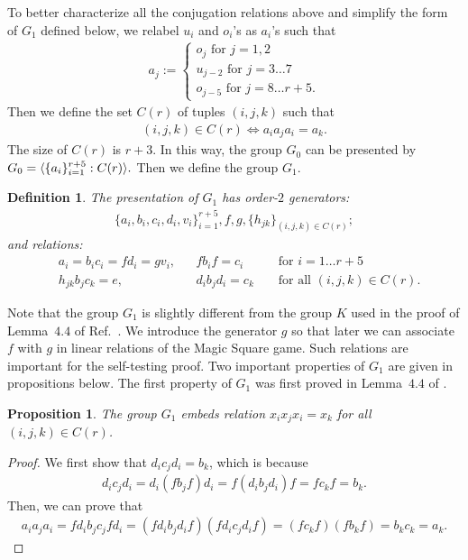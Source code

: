 \documentclass[11pt,letterpaper]{article}
\DeclarePairedDelimiter{\ip}{\langle}{\rangle}
\newcommand{\1}{\mathbb{1}}
\newtheorem{proposition}[theorem]{Proposition}
\newtheorem{definition}[theorem]{Definition}
\theoremstyle{definition}
\begin{document}
To better characterize all the conjugation relations above and simplify the form of $G_1$ defined below, 
we relabel $u_i$ and $o_i$'s
as $a_i$'s such that
\begin{align}
	a_j := 
	\begin{cases}
	 o_j \text{ for } j = 1,2 \\
	 u_{j-2} \text{ for } j = 3\dots 7 \\
	o_{j- 5} \text{ for } j = 8 \dots r+5.
	\end{cases}
\end{align}
Then we define the set $C(r)$ of tuples $(i,j,k)$ such that
\begin{align*}
	(i,j,k) \in C(r) \iff a_ia_ja_i = a_k.
\end{align*}
The size of $C(r)$ is $r+3$. 
In this way, the group $G_0$ can be presented by
$
G_0  = \ip{ \{a_i\}_{i=1}^{r+5} : C(r) }.
$
Then we define the group $G_1$.
\begin{definition}
The presentation of $G_1$ has order-$2$ generators:
\begin{align*}
	\{a_i, b_i, c_i, d_i, v_i\}_{i=1}^{r+5}, f, g, \{h_{jk}\}_{(i,j,k) \in C(r)};
\end{align*}
and relations:
\begin{align*}
	&a_i = b_ic_i = fd_i = gv_i,&& fb_if =c_i &&\text{ for } i= 1 \dots r+5 \\
	&h_{jk}b_j c_k = e,&& d_ib_jd_i = c_k &&\text{ for all } (i,j,k) \in C(r).
\end{align*}
\end{definition}
Note that the group $G_1$ is slightly different from the group $K$ used in the proof of Lemma~$4.4$ of Ref.~\cite{slofstra2017}.
We introduce the generator $g$ so that later we can associate $f$ with $g$ in linear relations of the Magic Square game.
Such relations are important for the self-testing proof.
Two important properties of $G_1$ are given in propositions below.
The first property of $G_1$ was first proved in Lemma~$4.4$ of \cite{slofstra2017}.
\begin{proposition}
	The group $G_1$ embeds relation $x_ix_jx_i = x_k$ for all $(i,j,k) \in C(r)$.
\end{proposition}
\begin{proof}
	We first show that $d_i c_j d_i = b_k$, which is because
	\begin{align*}
		d_i c_j d_i = d_i (f b_j f) d_i = f (d_i b_j d_i) f = f c_k f = b_k.
	\end{align*}
	Then, we can prove that 
	\begin{align*}
		a_i a_j a_i = f d_i b_j c_j f d_i = (f d_i b_j d_i f)(f d_i c_j d_i f) = (f c_k f)(f b_k f) = b_k c_k = a_k. 
	\end{align*}
\end{proof}
\end{document}
